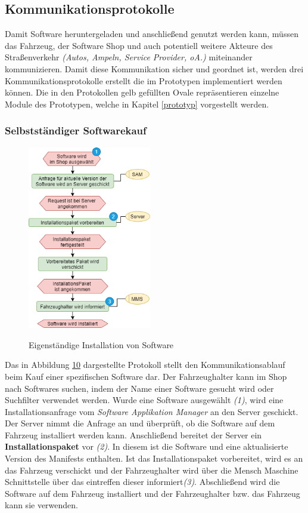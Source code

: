 \subsection{Kommunikationsprotokolle}\label{4.2}
Damit Software heruntergeladen und anschließend genutzt werden kann, müssen das Fahrzeug, der Software Shop und auch potentiell weitere Akteure des Straßenverkehr \textit{(Autos, Ampeln, Service Provider, oA.)} miteinander kommunizieren. Damit diese Kommunikation sicher und geordnet ist, werden drei Kommunikationsprotokolle erstellt die im Prototypen implementiert werden können. Die in den Protokollen gelb gefüllten Ovale repräsentieren einzelne Module des Prototypen, welche in Kapitel \ref{prototyp} vorgestellt werden.

\subsubsection{Selbstständiger Softwarekauf}
\begin{figure}
	\centering
	\includegraphics[width=0.48\textwidth]{pictures/konzept-Eigene-Installation.png}	\label{img:eigenstaendigIns}
	\caption{Eigenständige Installation von Software}
\end{figure}
Das in Abbildung \hyperref[img:eigenstaendigIns]{10} dargestellte Protokoll stellt den Kommunikationsablauf beim Kauf einer spezifischen Software dar. Der Fahrzeughalter kann im Shop nach Softwares suchen, indem der Name einer Software gesucht wird oder Suchfilter verwendet werden. Wurde eine Software ausgewählt \textit{(1)}, wird eine Installationsanfrage vom \textit{Software Applikation Manager} an den Server geschickt. Der Server nimmt die Anfrage an und überprüft, ob die Software auf dem Fahrzeug installiert werden kann. Anschließend bereitet der Server ein \textbf{Installationspaket} vor \textit{(2)}. In diesem ist die Software und eine aktualisierte Version des Manifests enthalten. Ist das Installationspaket vorbereitet, wird es an das Fahrzeug verschickt und der Fahrzeughalter wird über die Mensch Maschine Schnittstelle über das eintreffen dieser informiert\textit{(3)}. Abschließend wird die Software auf dem Fahrzeug installiert und der Fahrzeughalter bzw. das Fahrzeug kann sie verwenden.
\clearpage
